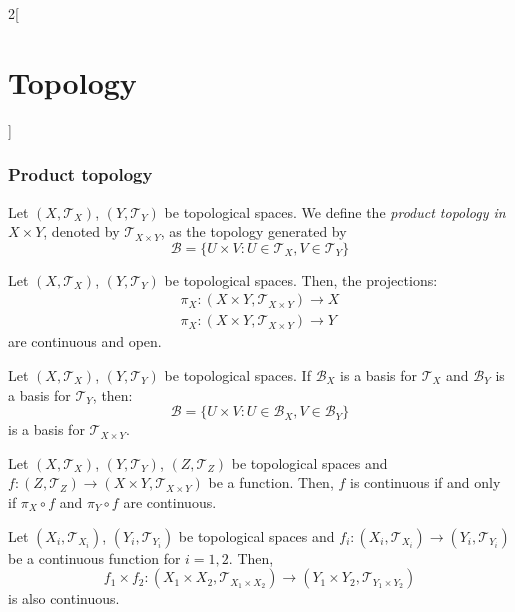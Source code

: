\documentclass[../../../main.tex]{subfiles}
\begin{document}
\begin{multicols}{2}[\section{Topology}]
  \subsubsection*{Product topology}
  \begin{definition}
    Let $(X,\mathcal{T}_X)$, $(Y,\mathcal{T}_Y)$ be topological spaces. We define the \textit{product topology in $X\times Y$}, denoted by $\mathcal{T}_{X\times Y}$, as the topology generated by $$\mathcal{B}=\{U\times V:U\in\mathcal{T}_X,V\in\mathcal{T}_Y\}$$
  \end{definition}
  \begin{prop}
    Let $(X,\mathcal{T}_X)$, $(Y,\mathcal{T}_Y)$ be topological spaces. Then, the projections:
    \begin{align*}
      \pi_X:(X\times Y,\mathcal{T}_{X\times Y})\longrightarrow X \\
      \pi_X:(X\times Y,\mathcal{T}_{X\times Y})\longrightarrow Y
    \end{align*}
    are continuous and open.
  \end{prop}
  \begin{prop}
    Let $(X,\mathcal{T}_X)$, $(Y,\mathcal{T}_Y)$ be topological spaces. If $\mathcal{B}_X$ is a basis for $\mathcal{T}_X$ and $\mathcal{B}_Y$ is a basis for $\mathcal{T}_Y$, then: $$\mathcal{B}=\{U\times V:U\in\mathcal{B}_X,V\in\mathcal{B}_Y\}$$
    is a basis for $\mathcal{T}_{X\times Y}$.
  \end{prop}
  \begin{prop}
    Let $(X,\mathcal{T}_X)$, $(Y,\mathcal{T}_Y)$, $(Z,\mathcal{T}_Z)$ be topological spaces and $f:(Z,\mathcal{T}_Z)\rightarrow(X\times Y,\mathcal{T}_{X\times Y})$ be a function. Then, $f$ is continuous if and only if $\pi_X\circ f$ and $\pi_Y\circ f$ are continuous.
  \end{prop}
  \begin{prop}
    Let $(X_i,\mathcal{T}_{X_i})$, $(Y_i,\mathcal{T}_{Y_i})$ be topological spaces and $f_i:(X_i,\mathcal{T}_{X_i})\rightarrow(Y_i,\mathcal{T}_{Y_i})$ be a continuous function for $i=1,2$. Then, $$f_1\times f_2:(X_1\times X_2,\mathcal{T}_{X_1\times X_2})\longrightarrow(Y_1\times Y_2,\mathcal{T}_{Y_1\times Y_2})$$ is also continuous.
  \end{prop}
\end{multicols}
\end{document}
